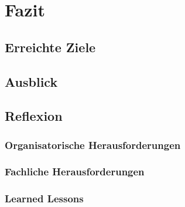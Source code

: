 
\chapter{Fazit}

\section{Erreichte Ziele}
\authorsection{\editordummy}

\section{Ausblick}
\authorsection{\editordummy}

\section{Reflexion}
\authorsection{\editordummy}

\subsection{Organisatorische Herausforderungen}

\subsection{Fachliche Herausforderungen}

\subsection{Learned Lessons}

